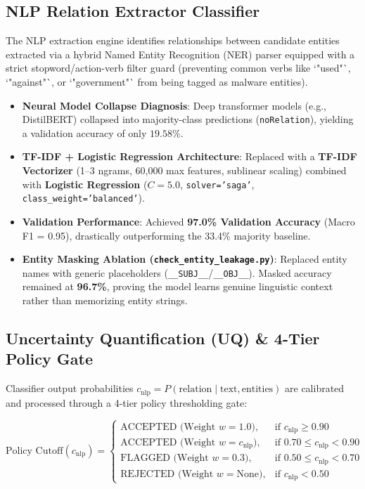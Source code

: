 \documentclass[11pt,a4paper]{article}
\begin{document}
\subsection{NLP Relation Extractor Classifier}
The NLP extraction engine identifies relationships between candidate entities extracted via a hybrid Named Entity Recognition (NER) parser equipped with a strict stopword/action-verb filter guard (preventing common verbs like `"used"`, `"against"`, or `"government"` from being tagged as malware entities).

\begin{itemize}
    \item \textbf{Neural Model Collapse Diagnosis}: Deep transformer models (e.g., DistilBERT) collapsed into majority-class predictions (\texttt{noRelation}), yielding a validation accuracy of only $19.58\%$.
    \item \textbf{TF-IDF + Logistic Regression Architecture}: Replaced with a \textbf{TF-IDF Vectorizer} (1–3 ngrams, 60,000 max features, sublinear scaling) combined with \textbf{Logistic Regression} ($C=5.0$, \texttt{solver='saga'}, \texttt{class\_weight='balanced'}).
    \item \textbf{Validation Performance}: Achieved \textbf{97.0\% Validation Accuracy} (Macro F1 = 0.95), drastically outperforming the 33.4\% majority baseline.
    \item \textbf{Entity Masking Ablation (\texttt{check\_entity\_leakage.py})}: Replaced entity names with generic placeholders (\texttt{\_\_SUBJ\_\_}/\texttt{\_\_OBJ\_\_}). Masked accuracy remained at \textbf{96.7\%}, proving the model learns genuine linguistic context rather than memorizing entity strings.
\end{itemize}

\subsection{Uncertainty Quantification (UQ) \& 4-Tier Policy Gate}
Classifier output probabilities $c_{\text{nlp}} = P(\text{relation} \mid \text{text}, \text{entities})$ are calibrated and processed through a 4-tier policy thresholding gate:

\begin{equation}
\text{Policy Cutoff}(c_{\text{nlp}}) = 
\begin{cases}
    \text{ACCEPTED (Weight } w = 1.0), & \text{if } c_{\text{nlp}} \ge 0.90 \\
    \text{ACCEPTED (Weight } w = c_{\text{nlp}}), & \text{if } 0.70 \le c_{\text{nlp}} < 0.90 \\
    \text{FLAGGED (Weight } w = 0.3), & \text{if } 0.50 \le c_{\text{nlp}} < 0.70 \\
    \text{REJECTED (Weight } w = \text{None}), & \text{if } c_{\text{nlp}} < 0.50
\end{cases}
\end{equation}
\end{document}
